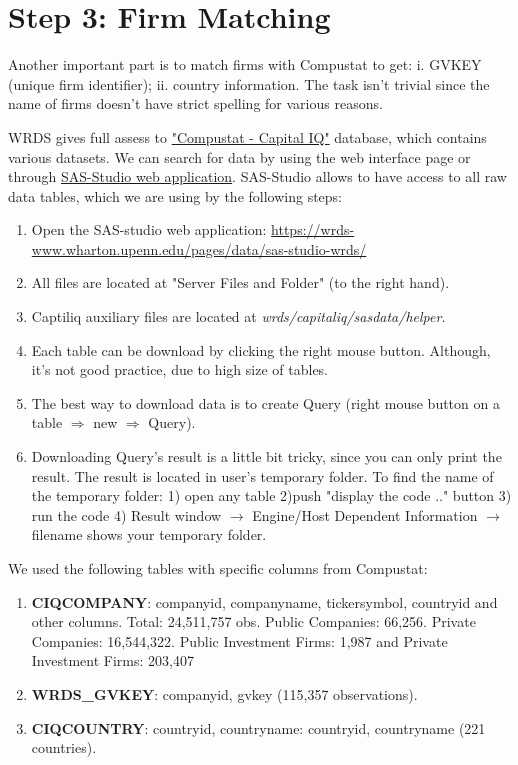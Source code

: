 \documentclass[11pt]{article}
\newcounter{file}
\begin{document}
\section{Step 3: Firm Matching}
\par Another important part is to match firms with Compustat to get: i. GVKEY (unique firm identifier); ii. country information. The task isn't trivial since the name of firms doesn't have strict spelling for various reasons.
\par WRDS gives full assess to \href{https://wrds-web.wharton.upenn.edu/wrds/query_forms/navigation.cfm?navId=60}{"Compustat - Capital IQ"} database, which contains various datasets. We can search for data by using the web interface page or through \href{https://wrds-www.wharton.upenn.edu/pages/data/sas-studio-wrds/}{SAS-Studio web application}. SAS-Studio allows to have access to all raw data tables, which we are using by the following steps:
\begin{enumerate}
\item Open the SAS-studio web application: \href{https://wrds-www.wharton.upenn.edu/pages/data/sas-studio-wrds/}{https://wrds-www.wharton.upenn.edu/pages/data/sas-studio-wrds/}
\item All files are located at "Server Files and Folder" (to the right hand).
\item Captiliq auxiliary files are located at \textit{wrds/capitaliq/sasdata/helper}.
\item Each table can be download by clicking the right mouse button. Although, it's not good practice, due to high size of tables.
\item The best way to download data is to create Query (right mouse button on a table $\Rightarrow$ new $\Rightarrow$ Query). 
\item Downloading Query's result is a little bit tricky, since you can only print the result. The result is located in user's temporary folder. To find the name of the temporary folder: 1) open any table 2)push "display the code .." button 3) run the code 4) Result window $\rightarrow$ Engine/Host Dependent Information $\rightarrow$ filename shows your temporary folder. 
\end{enumerate}
\par We used the following tables with specific columns from Compustat:
\begin{enumerate}
	\item \textbf{CIQCOMPANY}: companyid, companyname, tickersymbol, countryid and other columns. Total: 24,511,757 obs. Public Companies: 66,256. Private Companies: 16,544,322. Public Investment Firms: 1,987 and Private Investment Firms: 203,407
	\item \textbf{WRDS\_GVKEY}: companyid, gvkey (115,357 observations).
	\item \textbf{CIQCOUNTRY}: countryid, countryname: countryid, countryname (221 countries).
\end{enumerate}
\end{document}
